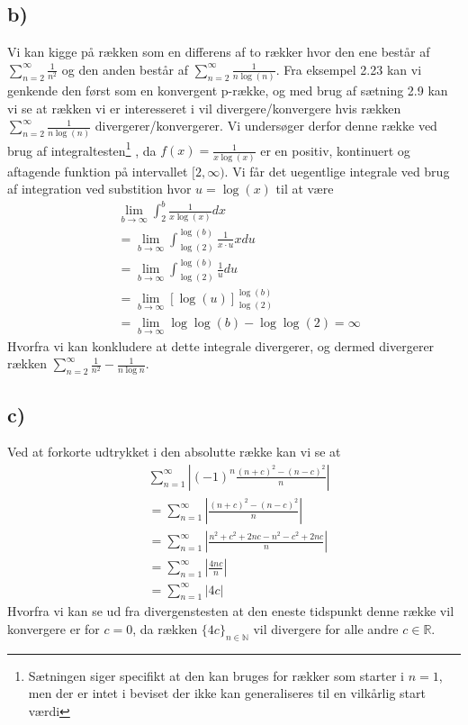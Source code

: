 \documentclass{article}
\newcommand{\m}[1]{\mathbb{#1}}
\newcommand{\mR}{\m{R}}
\newcommand{\mN}{\m{N}}
\newcommand{\abs}[1]{\left| #1\right|}
\newcommand{\lrb}[1]{\left[ #1\right]}
\begin{document}
\subsection*{b)}
Vi kan kigge på rækken som en differens af to rækker 
hvor den ene består af $\sum_{n=2}^{\infty} \frac{1}{n^2}$ 
og den anden består af $\sum_{n=2}^{\infty} \frac{1}{n\log(n)}$. 
Fra eksempel 2.23\cite{an1} kan vi genkende den først som en konvergent p-række, 
og med brug af sætning 2.9\cite{an1} kan vi se at rækken vi er interesseret i vil
divergere/konvergere hvis rækken $\sum_{n=2}^{\infty} \frac{1}{n\log(n)}$ divergerer/konvergerer.
Vi undersøger derfor denne række ved brug af integraltesten\footnote{
    Sætningen siger specifikt at den kan bruges for rækker som starter i $n=1$,
    men der er intet i beviset der ikke kan generaliseres til en vilkårlig start værdi} 
\cite[sætning 2.20]{an1}, da
$f(x)=\frac{1}{x\log(x)}$ er en positiv, kontinuert og aftagende funktion på intervallet $[2, \infty)$.
Vi får det uegentlige integrale ved brug af integration ved substition \cite[sætning 5.39]{an0} hvor $u = \log(x)$ til at være
\begin{align*}
   &\lim_{b \to \infty} \int_{2}^{b} \frac{1}{x\log(x)} dx \\
   &=\lim_{b \to \infty} \int_{\log(2)}^{\log(b)} \frac{1}{x\cdot u}x du \\
   &=\lim_{b \to \infty} \int_{\log(2)}^{\log(b)} \frac{1}{u} du \\
   &=\lim_{b \to \infty} \lrb{\log(u)}_{\log(2)}^{\log(b)} \\
   &=\lim_{b \to \infty} \log\log(b) - \log\log(2)
   =\infty
\end{align*}
Hvorfra vi kan konkludere  at dette integrale divergerer, og dermed divergerer rækken 
$\sum_{n=2}^{\infty}\frac{1}{n^2} - \frac{1}{n\log{n}}$.

\subsection*{c)}
Ved at forkorte udtrykket i den absolutte række kan vi se at
\begin{align*}
    &\sum_{n=1}^{\infty} \abs{(-1)^n \frac{(n+c)^2 - (n-c)^2}{n}} \\
    &=\sum_{n=1}^{\infty} \abs{\frac{(n+c)^2 - (n-c)^2}{n}} \\
    &=\sum_{n=1}^{\infty} \abs{\frac{n^2+c^2 + 2nc - n^2 - c^2 + 2nc}{n}} \\
    &=\sum_{n=1}^{\infty} \abs{\frac{4nc}{n}} \\
    &=\sum_{n=1}^{\infty} \abs{4c}
\end{align*}
Hvorfra vi kan se ud fra divergenstesten \cite[Sætning 2.2]{an1} at den eneste tidspunkt denne række vil konvergere er for $c=0$,
da rækken $\{4c\}_{n \in \mN}$ vil divergere for alle andre $c \in \mR$.
\end{document}
